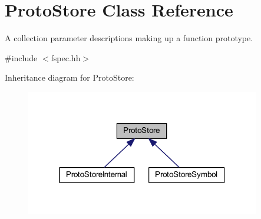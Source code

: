 \hypertarget{class_proto_store}{}\section{Proto\+Store Class Reference}
\label{class_proto_store}


A collection parameter descriptions making up a function prototype.  




{\ttfamily \#include $<$fspec.\+hh$>$}



Inheritance diagram for Proto\+Store\+:
\nopagebreak
\begin{figure}[H]
\begin{center}
\leavevmode
\includegraphics[width=290pt]{class_proto_store__inherit__graph}
\end{center}
\end{figure}

